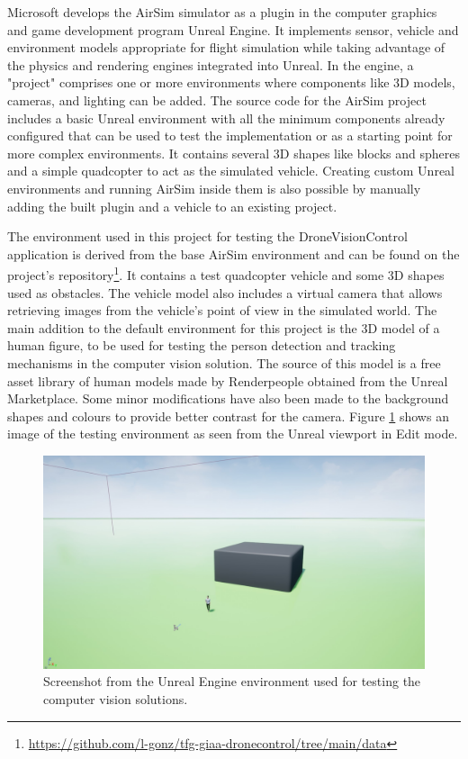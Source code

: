 Microsoft develops the AirSim simulator as a plugin in the computer graphics and game development program Unreal Engine.
It implements sensor, vehicle and environment models appropriate for flight simulation while taking advantage of the physics and rendering engines integrated into Unreal.
In the engine, a "project" comprises one or more environments where components like 3D models, cameras, and lighting can be added.
The source code for the AirSim project includes a basic Unreal environment with all the minimum components already configured that can be used to test the implementation or as a starting point for more complex environments. It contains several 3D shapes like blocks and spheres and a simple quadcopter to act as the simulated vehicle.
Creating custom Unreal environments and running AirSim inside them is also possible by manually adding the built plugin and a vehicle to an existing project.

The environment used in this project for testing the DroneVisionControl application is derived from the base AirSim environment and can be found on the project’s repository\footnote{\url{https://github.com/l-gonz/tfg-giaa-dronecontrol/tree/main/data}}. It contains a test quadcopter vehicle and some 3D shapes used as obstacles. The vehicle model also includes a virtual camera that allows retrieving images from the vehicle’s point of view in the simulated world.
The main addition to the default environment for this project is the 3D model of a human figure, to be used for testing the person detection and tracking mechanisms in the computer vision solution. The source of this model is a free asset library of human models made by Renderpeople \cite{render-people} obtained from the Unreal Marketplace. Some minor modifications have also been made to the background shapes and colours to provide better contrast for the camera. Figure \ref{fig:unreal-env} shows an image of the testing environment as seen from the Unreal viewport in Edit mode.


\begin{figure}
  \centering
  \includegraphics[width=\textwidth,keepaspectratio]{img/unreal-env.jpg}
  \caption{Screenshot from the Unreal Engine environment used for testing the computer vision solutions.}
  \label{fig:unreal-env}
\end{figure}


